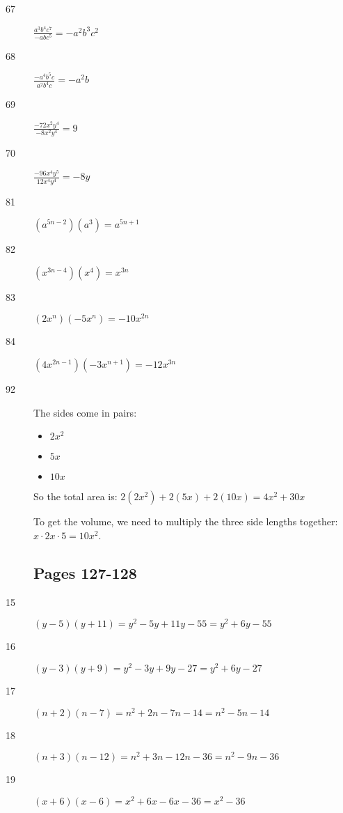 \documentclass[fleqn,addpoints]{exam}
\begin{document}
\begin{description}
\item[67]
\( \displaystyle \frac{a^3b^4c^7}{-abc^5} = -a^2b^3c^2 \)

\item[68]
\( \displaystyle \frac{-a^4b^5c}{a^2b^4c} = -a^2b \)

\item[69]
\( \displaystyle \frac{-72x^2y^4}{-8x^2y^4} = 9 \)

\item[70]
\( \displaystyle \frac{-96x^4y^5}{12x^4y^4} = -8y \)

\item[81]
\( (a^{5n-2})(a^3) = a^{5n+1} \)

\item[82]
\( (x^{3n-4})(x^4) = x^{3n} \)

\item[83]
\( (2x^n)(-5x^n) = -10x^{2n} \)

\item[84]
\( (4x^{2n-1})(-3x^{n+1}) = -12x^{3n} \)

\item[92]

The sides come in pairs: 
\begin{itemize}
  \item \( 2x^2 \)
  \item \( 5x \)
  \item \( 10x \)
\end{itemize}

So the total area is: \( 2(2x^2) + 2(5x) + 2(10x) = 4x^2 + 30x \)

To get the volume, we need to multiply the three side lengths together: 
\(x \cdot 2x \cdot 5 = 10x^2 \).

\subsection{Pages 127-128}

\item[15]
\( (y-5)(y+11) = y^2 -5y + 11y - 55 = y^2 + 6y - 55 \)

\item[16]
\( (y - 3)(y + 9) = y^2 - 3y + 9y - 27 = y^2 + 6y - 27 \)

\item[17]
\( (n + 2)(n - 7) = n^2 + 2n - 7n - 14 = n^2 - 5n - 14 \)

\item[18]
\( (n + 3)(n - 12) = n^2 + 3n - 12n - 36 = n^2 - 9n - 36 \)

\item[19]
\( (x + 6)(x - 6) = x^2 + 6x - 6x - 36 = x^2 - 36 \)


\end{description}
\end{document}
